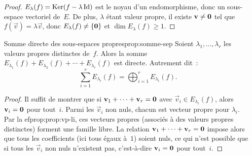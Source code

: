 \begin{proof}
  $E_\lambda(f)=\operatorname{Ker}(f-\lambda\operatorname{Id})$ est le noyau d'un endomorphisme,
  donc un sous-espace vectoriel de~$E$. De plus, $\lambda$ étant valeur
  propre, il existe $\mathbf{v}\neq\mathbf{0}$ tel que $f(\vec{v})=\lambda\vec{v}$,
  donc $E_\lambda(f)\neq\left\{\mathbf{0}\right\}$ et $\dim E_\lambda(f)\geq 1$.
\end{proof}

\begin{proposition}{Somme directe des sous-espaces propres}{prop:somme-sep}
  Soient $\lambda_1,\ldots,\lambda_r$ les valeurs propres distinctes
  de~$f$. Alors la somme
  $E_{\lambda_1}(f)+E_{\lambda_2}(f)+\cdots+E_{\lambda_r}(f)$
  est directe. Autrement dit~:
  \[
    \sum_{i=1}^{r}E_{\lambda_i}(f)=\bigoplus_{i=1}^{r}E_{\lambda_i}(f).
  \]
\end{proposition}

\begin{proof}
  Il suffit de montrer que si $\mathbf{v}_1+\cdots+\mathbf{v}_r=\mathbf{0}$ avec
  $\vec{v}_i\in E_{\lambda_i}(f)$, alors $\mathbf{v}_i=\mathbf{0}$ pour tout~$i$.
  Parmi les $\vec{v}_i$ non nuls, chacun est vecteur propre pour
  $\lambda_i$. Par la 
ef{prop:prop:vp-li}, ces vecteurs propres (associés
  à des valeurs propres distinctes) forment une famille libre. La relation
  $\mathbf{v}_1+\cdots+\mathbf{v}_r=\mathbf{0}$ impose alors que tous les
  coefficients (ici tous égaux à~$1$) soient nuls, ce qui n'est possible
  que si tous les $\vec{v}_i$ non nuls n'existent pas, c'est-à-dire
  $\mathbf{v}_i=\mathbf{0}$ pour tout~$i$.
\end{proof}

